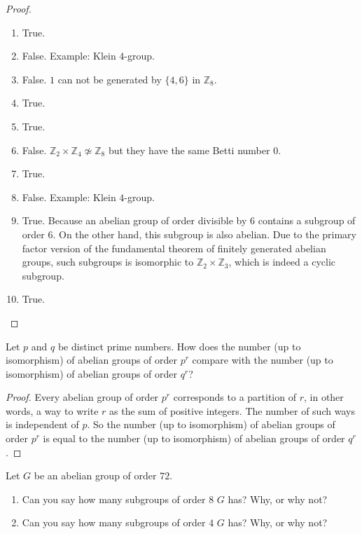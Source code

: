 \begin{proof}
    \begin{enumerate}[label={\textbf{\arabic*.}}]
        \item True.
        \item False. Example: Klein $4$-group.
        \item False. $1$ can not be generated by $\{ 4, 6 \}$ in $\mathbb{Z}_{8}$.
        \item True.
        \item True.
        \item False. $\mathbb{Z}_{2}\times\mathbb{Z}_{4} \not\simeq \mathbb{Z}_{8}$ but they have the same Betti number $0$.
        \item True.
        \item False. Example: Klein $4$-group.
        \item True. Because an abelian group of order divisible by $6$ contains a subgroup of order $6$. On the other hand, this subgroup is also abelian. Due to the primary factor version of the fundamental theorem of finitely generated abelian groups, such subgroups is isomorphic to $\mathbb{Z}_{2}\times\mathbb{Z}_{3}$, which is indeed a cyclic subgroup.
        \item True.
    \end{enumerate}
\end{proof}

\begin{exercise}
    Let $p$ and $q$ be distinct prime numbers. How does the number (up to isomorphism) of abelian groups of order $p^{r}$ compare with the number (up to isomorphism) of abelian groups of order $q^{r}$?
\end{exercise}

\begin{proof}
    Every abelian group of order $p^{r}$ corresponds to a partition of $r$, in other words, a way to write $r$ as the sum of positive integers. The number of such ways is independent of $p$. So the number (up to isomorphism) of abelian groups of order $p^{r}$ is equal to the number (up to isomorphism) of abelian groups of order $q^{r}$.
\end{proof}

\begin{exercise}
    Let $G$ be an abelian group of order $72$.
    \begin{enumerate}[label={\textbf{\alph*.}}]
        \item Can you say how many subgroups of order $8$ $G$ has? Why, or why not?
        \item Can you say how many subgroups of order $4$ $G$ has? Why, or why not?
    \end{enumerate}
\end{exercise}

